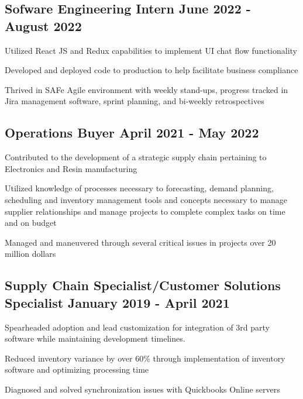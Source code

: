\subsection{{Sofware Engineering Intern \hfill June 2022 - August 2022}}
\begin{zitemize}
\item Utilized React JS and Redux capabilities to implement UI chat flow functionality
\item Developed and deployed code to production to help facilitate business compliance
\item Thrived in SAFe Agile environment with weekly stand-ups, progress tracked in Jira management software, sprint planning, and bi-weekly retrospectives
\end{zitemize}

\subsection{{Operations Buyer \hfill April 2021 - May 2022}}
\begin{zitemize}
\item Contributed to the development of a strategic supply chain pertaining to Electronics and Resin manufacturing
\item Utilized knowledge of processes necessary to forecasting, demand planning, scheduling and inventory management tools and concepts necessary to manage supplier relationships and manage projects to complete complex tasks on time and on budget
\item Managed and maneuvered through several critical issues in projects over 20 million dollars
\end{zitemize}

\subsection{{Supply Chain Specialist/Customer Solutions Specialist \hfill January 2019 - April 2021}}
\begin{zitemize}
\item Spearheaded adoption and lead customization for integration of 3rd party software while maintaining development timelines.
\item Reduced inventory variance by over 60\% through implementation of inventory software and optimizing processing time
\item Diagnosed and solved synchronization issues with Quickbooks Online servers
\end{zitemize}

